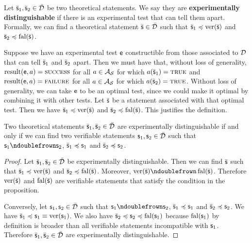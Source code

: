 	\begin{mathSection}
		\begin{defn}\label{pm-vs-defExperimentallyDistinguishable}
			Let $\bar{\mathsf{s}}_1, \bar{\mathsf{s}}_2 \in \bar{\mathcal{D}}$ be two theoretical statements. We say they are \textbf{experimentally distinguishable} if there is an experimental test that can tell them apart. Formally, we can find a theoretical statement $\bar{\mathsf{s}} \in \bar{\mathcal{D}}$ such that $\bar{\mathsf{s}}_1 \preccurlyeq \operatorname{ver}(\bar{\mathsf{s}})$ and $\bar{\mathsf{s}}_2 \preccurlyeq \operatorname{fal}(\bar{\mathsf{s}})$.
		\end{defn}
		\begin{justification}
			Suppose we have an experimental test $\mathsf{e}$ constructible from those associated to $\mathcal{D}$ that can tell $\bar{\mathsf{s}}_1$ and $\bar{\mathsf{s}}_2$ apart. Then we must have that, without loss of generality, $\operatorname{result}(\mathsf{e}, a) = \textsc{success}$ for all $a \in \mathcal{A}_{\mathcal{S}}$ for which $a(\bar{\mathsf{s}}_1) = \textup{\textsc{true}}$ and $\operatorname{result}(\mathsf{e}, a) = \textsc{failure}$ for all $a \in \mathcal{A}_{\mathcal{S}}$ for which $a(\bar{\mathsf{s}}_2) = \textup{\textsc{true}}$. Without loss of generality, we can take $\mathsf{e}$ to be an optimal test, since we could make it optimal by combining it with other tests. Let $\bar{\mathsf{s}}$ be a statement associated with that optimal test. Then we have $\bar{\mathsf{s}}_1 \preccurlyeq \operatorname{ver}(\bar{\mathsf{s}})$ and $\bar{\mathsf{s}}_2 \preccurlyeq \operatorname{fal}(\bar{\mathsf{s}})$. This justifies the definition.
		\end{justification}
		
		\begin{prop}\label{pm-vs-experimentallyDistinguishableIsDisjointApproximation}
			Two theoretical statements $\bar{\mathsf{s}}_1, \bar{\mathsf{s}}_2 \in \bar{\mathcal{D}}$ are experimentally distinguishable if and only if we can find two verifiable statements $\mathsf{s}_1, \mathsf{s}_2 \in \bar{\mathcal{D}}$ such that $\stmt_1 \ncomp \stmt_2$, $\bar{\mathsf{s}}_1 \preccurlyeq \mathsf{s}_1$ and $\bar{\mathsf{s}}_2 \preccurlyeq \mathsf{s}_2$.
		\end{prop}
		\begin{proof}
			Let $\bar{\mathsf{s}}_1, \bar{\mathsf{s}}_2 \in \bar{\mathcal{D}}$ be experimentally distinguishable. Then we can find $\bar{\mathsf{s}}$ such that $\bar{\mathsf{s}}_1 \preccurlyeq \operatorname{ver}(\bar{\mathsf{s}})$ and $\bar{\mathsf{s}}_2 \preccurlyeq \operatorname{fal}(\bar{\mathsf{s}})$. Moreover, $\ver(\bar{\stmt}) \ncomp \fal(\bar{\stmt})$. Therefore $\operatorname{ver}(\bar{\mathsf{s}})$ and $\operatorname{fal}(\bar{\mathsf{s}})$ are verifiable statements that satisfy the condition in the proposition.
			
			Conversely, let $\mathsf{s}_1, \mathsf{s}_2 \in \bar{\mathcal{D}}$ such that $\stmt_1 \ncomp \stmt_2$, $\bar{\mathsf{s}}_1 \preccurlyeq \mathsf{s}_1$ and $\bar{\mathsf{s}}_2 \preccurlyeq \mathsf{s}_2$. We have $\bar{\mathsf{s}}_1 \preccurlyeq \mathsf{s}_1 \equiv \operatorname{ver}(\mathsf{s}_1)$. We also have $\bar{\mathsf{s}}_2 \preccurlyeq \mathsf{s}_2 \preccurlyeq \operatorname{fal}(\mathsf{s}_1)$ because $\operatorname{fal}(\mathsf{s}_1)$ by definition is broader than all verifiable statements incompatible with $\mathsf{s}_1$. Therefore $\bar{\mathsf{s}}_1, \bar{\mathsf{s}}_2 \in \bar{\mathcal{D}}$ are experimentally distinguishable.
		\end{proof}
	\end{mathSection}
	
